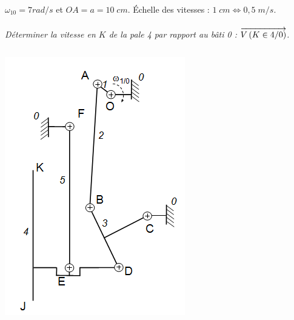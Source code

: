 \documentclass[11pt,oneside]{article}
\begin{document}
$\omega_{10} = 7 rad/s$ et $OA =a= 10\; cm$. Échelle des vitesses : $1\; cm \Longleftrightarrow 0,5\; m/s$.
\paragraph{}
\textit{Déterminer la vitesse en $K$ de la pale 4 par rapport au bâti 0 : $\overrightarrow{V\left( {K} \in {4}/{0}\right)}$.}

\newpage
$$
\quad
$$

\begin{center}
\includegraphics[width=.7\textwidth]{png/fig2}
\end{center}
\end{document}
